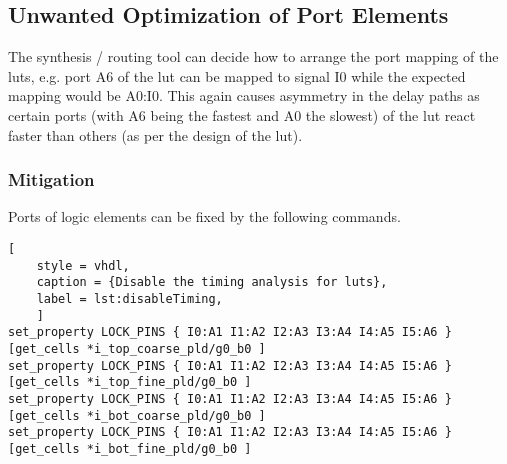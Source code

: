 \subsection{Unwanted Optimization of Port Elements}
The synthesis / routing tool can decide how to arrange the port mapping of the luts, e.g.
port A6 of the lut can be mapped to signal I0 while the expected mapping would be A0:I0. 
This again causes asymmetry in the delay paths as certain ports (with A6 being the fastest
and A0 the slowest) of the lut react faster than others (as per the design of the lut).

\subsubsection{Mitigation}
Ports of logic elements can be fixed by the following commands. 

\begin{lstlisting}[
	style = vhdl,
	caption = {Disable the timing analysis for luts},
	label = lst:disableTiming,
	]
set_property LOCK_PINS { I0:A1 I1:A2 I2:A3 I3:A4 I4:A5 I5:A6 } [get_cells *i_top_coarse_pld/g0_b0 ]
set_property LOCK_PINS { I0:A1 I1:A2 I2:A3 I3:A4 I4:A5 I5:A6 } [get_cells *i_top_fine_pld/g0_b0 ]
set_property LOCK_PINS { I0:A1 I1:A2 I2:A3 I3:A4 I4:A5 I5:A6 } [get_cells *i_bot_coarse_pld/g0_b0 ]
set_property LOCK_PINS { I0:A1 I1:A2 I2:A3 I3:A4 I4:A5 I5:A6 } [get_cells *i_bot_fine_pld/g0_b0 ]
\end{lstlisting}
